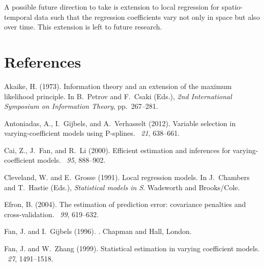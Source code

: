 \documentclass[authoryear,review, 12pt]{elsarticle}
\begin{document}
A possible future direction to take is extension to local regression for spatio-temporal data such that the regression coefficients vary not only in space but also over time. This extension is left to future research.


\section*{References}

\begin{thebibliography}{}

Akaike, H. (1973).
\newblock Information theory and an extension of the maximum likelihood
  principle.
\newblock In B.~Petrov and F.~Csaki (Eds.), {\em 2nd International Symposium on
  Information Theory}, pp.\  267--281.

Antoniadas, A., I.~Gijbels, and A.~Verhasselt (2012).
\newblock Variable selection in varying-coefficient models using {P}-splines.
~{\em 21},
  638--661.

Cai, Z., J.~Fan, and R.~Li (2000).
\newblock Efficient estimation and inferences for varying-coefficient models.
~{\em 95},
  888--902.

Cleveland, W. and E.~Grosse (1991).
\newblock Local regression models.
\newblock In J.~Chambers and T.~Hastie (Eds.), {\em Statistical models in S}.
  Wadsworth and Brooks/Cole.

Efron, B. (2004).
\newblock The estimation of prediction error: covariance penalties and
  cross-validation.
~{\em 99},
  619--632.

Fan, J. and I.~Gijbels (1996).
.
\newblock Chapman and Hall, London.

Fan, J. and W.~Zhang (1999).
\newblock Statistical estimation in varying coefficient models.
~{\em 27}, 1491--1518.


\end{thebibliography}
\end{document}
